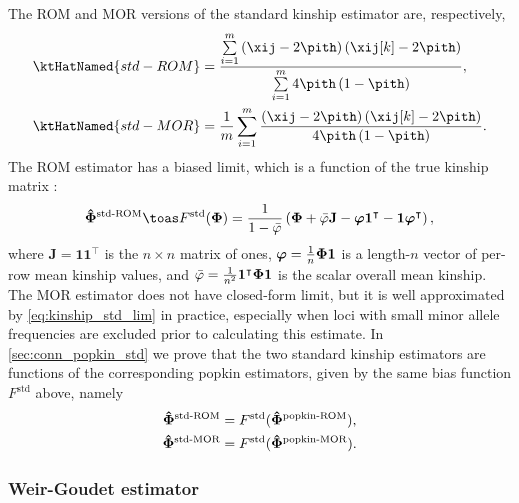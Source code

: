 \documentclass[11pt]{article}
\newcommand{\kinMat}{%
  \ensuremath{%
    \mathbf{\Phi}
  }%
  \xspace%
}%
\newcommand{\kinMatEstNamed}[1]{%
  \ensuremath{%
    \mathbf{\hat{\Phi}}^\text{#1}
  }%
  \xspace%
}%
\begin{document}
The ROM and MOR versions of the standard kinship estimator are, respectively,
\begin{align}
  \label{eq:kinship_std_rom}
  \ktHatNamed{std-ROM}
  &=
    \frac{
    \sum\limits_{i=1}^m \left( \xij - 2 \pith \right) \left( \xij[k] - 2 \pith \right)
    }{
    \sum\limits_{i=1}^m 4 \pith \left( 1-\pith \right)
    }
    , \\
  \label{eq:kinship_std_mor}
  \ktHatNamed{std-MOR}
  &=
    \frac{1}{m} \sum\limits_{i=1}^m \frac{\left( \xij - 2 \pith \right) \left( \xij[k] - 2 \pith \right)}{4 \pith \left( 1-\pith \right)}
    .
\end{align}
The ROM estimator has a biased limit, which is a function of the true kinship matrix \citep{ochoa_estimating_2021}:
\begin{equation}
  \label{eq:kinship_std_lim}
  \kinMatEstNamed{std-ROM}
  \toas
  F^\text{std}( \kinMat )
  =
  \frac{1}{1 - \bar{\varphi}}
  \left(
    \kinMat
    + \bar{\varphi} \mathbf{J}
    - \boldsymbol{\varphi} \mathbf{1}^\intercal 
    - \mathbf{1} \boldsymbol{\varphi}^\intercal 
  \right)
  ,
\end{equation}
where
$\mathbf{J} = \mathbf{1} \mathbf{1}^\intercal$ is the $n \times n$ matrix of ones,
$\boldsymbol{\varphi} = \frac{1}{n} \kinMat \mathbf{1}$ is a length-$n$ vector of per-row mean kinship values, and
$\bar{\varphi} = \frac{1}{n^2} \mathbf{1}^\intercal \kinMat \mathbf{1}$ is the scalar overall mean kinship.
The MOR estimator does not have closed-form limit, but it is well approximated by \cref{eq:kinship_std_lim} in practice, especially when loci with small minor allele frequencies are excluded prior to calculating this estimate.
In \cref{sec:conn_popkin_std} we prove that the two standard kinship estimators are functions of the corresponding popkin estimators, given by the same bias function $F^\text{std}$ above, namely
\begin{align*}
  \kinMatEstNamed{std-ROM} &= F^\text{std}( \kinMatEstNamed{popkin-ROM} ), \\
  \kinMatEstNamed{std-MOR} &= F^\text{std}( \kinMatEstNamed{popkin-MOR} )
                             .
\end{align*}

\subsubsection{Weir-Goudet estimator}
\end{document}
